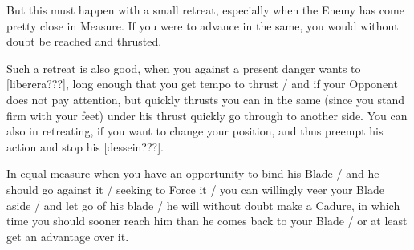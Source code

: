 \newpage


\newpage


But this must happen with a small retreat, especially when the Enemy
has come pretty close in Measure. If you were to advance in the same,
you would without doubt be reached and thrusted.


Such a retreat is also good, when you against a present danger wants
to [liberera???], long enough that you get tempo to
thrust / and if your Opponent does not pay attention, but quickly
thrusts you can in the same (since you stand firm with your feet)
under his thrust quickly go through to another side. You can also in
retreating, if you want to change your position, and thus preempt his
action and stop his [dessein???].


In equal measure when you have an opportunity to bind his Blade / and
he should go against it / seeking to Force it / you can willingly veer your
Blade aside / and let go of his blade / he will without doubt make a
Cadure, in which time you should sooner reach him than he comes back
to your Blade / or at least get an advantage over it.


